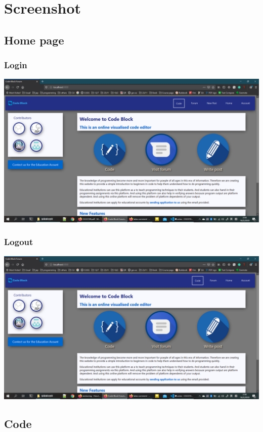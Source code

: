 \section{Screenshot}
\subsection{Home page}
\subsubsection{Login}
\includegraphics[scale=0.4]{Doc/Pics/home_login.png}

\subsubsection{Logout}
\includegraphics[scale=0.4]{Doc/Pics/home_logout.png}

\subsection{Code}
